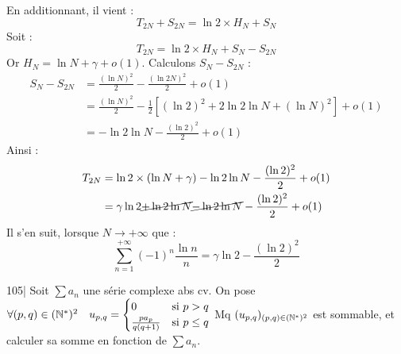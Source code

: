 \begin{solution}
En additionnant, il vient : 
\[ T_{2N} + S_{2N} = \ln 2 \times H_N + S_N \]
Soit :
\[ T_{2N} = \ln 2 \times H_N + S_N - S_{2N} \]
Or $H_N = \ln N + \gamma + o(1)$. Calculons $S_N - S_{2N}$ :
\begin{align*}
S_N - S_{2N} &= \frac{(\ln N)^2}{2} - \frac{(\ln 2N)^2}{2} + o(1) \\
&= \frac{(\ln N)^2}{2} - \frac{1}{2} \left[ (\ln 2)^2 + 2\ln 2 \ln N + (\ln N)^2 \right] + o(1) \\
&= -\ln 2 \ln N - \frac{(\ln 2)^2}{2} + o(1)
\end{align*}
Ainsi :
\begin{align*}
T_{2N} &= \ln 2 \times (\ln N + \gamma) - \ln 2 \ln N - \frac{(\ln 2)^2}{2} + o(1) \\
&= \gamma \ln 2 \cancel{+\ln 2 \ln N} \cancel{- \ln 2 \ln N} - \frac{(\ln 2)^2}{2} + o(1)
\end{align*}
Il s'en suit, lorsque $N \to +\infty$ que :
\[ \boxed{\sum_{n=1}^{+\infty} (-1)^n \frac{\ln n}{n} = \gamma \ln 2 - \frac{(\ln 2)^2}{2}} \]
\end{solution}


\begin{statementbox}
105| Soit $\sum a_n$ une série complexe abs cv.
On pose $\forall(p,q) \in (\mathbb N^*)^2 \quad u_{p,q} = \begin{cases} 0 & \text{si } p > q \\ \frac{p a_p}{q(q+1)} & \text{si } p \leq q \end{cases}$
Mq $(u_{p,q})_{(p,q)\in(\mathbb N^*)^2}$ est sommable, et calculer sa somme en fonction de $\sum a_n$.
\end{statementbox}

